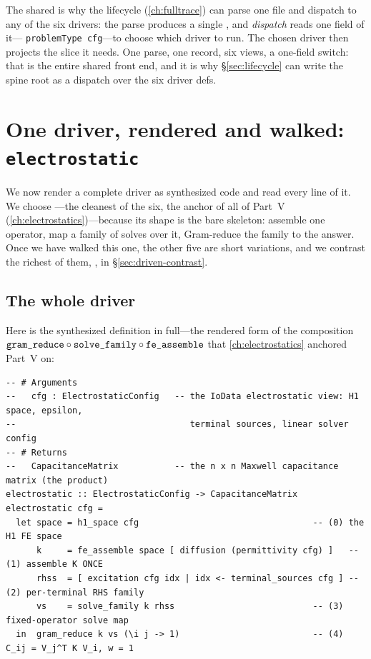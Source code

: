 \begin{notationbox}
The shared  is why the lifecycle (\cref{ch:fulltrace}) can parse one
file and dispatch to any of the six drivers: the parse produces a single
, and \emph{dispatch} reads one field of it---%
\lstinline[style=l4style]|problemType cfg|---to choose which driver to run. The
chosen driver then projects the slice it needs. One parse, one record, six views, a
one-field switch: that is the entire shared front end, and it is why
\S\ref{sec:lifecycle} can write the spine root as a dispatch over the six driver
defs.
\end{notationbox}

\section{One driver, rendered and walked: \texttt{electrostatic}}
\label{sec:es-rendered}

We now render a complete driver as synthesized code and read every line of it. We
choose ---the cleanest of the six, the anchor of all of Part~V
(\cref{ch:electrostatics})---because its shape is the bare skeleton: assemble one
operator, map a family of solves over it, Gram-reduce the family to the answer. Once
we have walked this one, the other five are short variations, and we contrast the
richest of them, , in \S\ref{sec:driven-contrast}.

\subsection{The whole driver}

Here is the synthesized  definition in full---the rendered form
of the composition $\texttt{gram\_reduce}\circ\texttt{solve\_family}\circ
\texttt{fe\_assemble}$ that \cref{ch:electrostatics} anchored Part~V on:

\begin{lstlisting}[style=l4style]
-- # Arguments
--   cfg : ElectrostaticConfig   -- the IoData electrostatic view: H1 space, epsilon,
--                                  terminal sources, linear solver config
-- # Returns
--   CapacitanceMatrix           -- the n x n Maxwell capacitance matrix (the product)
electrostatic :: ElectrostaticConfig -> CapacitanceMatrix
electrostatic cfg =
  let space = h1_space cfg                                  -- (0) the H1 FE space
      k     = fe_assemble space [ diffusion (permittivity cfg) ]   -- (1) assemble K ONCE
      rhss  = [ excitation cfg idx | idx <- terminal_sources cfg ] -- (2) per-terminal RHS family
      vs    = solve_family k rhss                           -- (3) fixed-operator solve map
  in  gram_reduce k vs (\i j -> 1)                          -- (4) C_ij = V_j^T K V_i, w = 1
\end{lstlisting}

